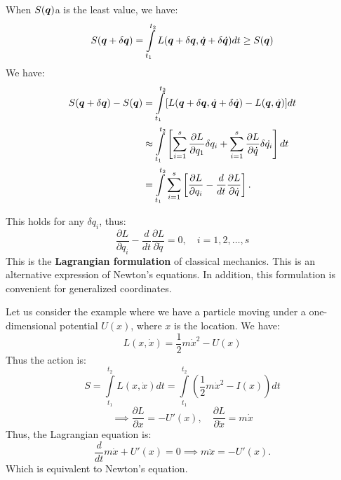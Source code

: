 \documentclass[../main/main.tex]{subfiles}
\begin{document}
When $S(\bm{q})$a is the least value, we have: \[
	S(\bm{q} + \delta \bm{q}) = \int\limits_{t_1}^{t_2}L(\bm{q}+\delta \bm{q}, \dot{\bm{q}}+ \delta \dot{\bm{q}}) dt \geq S(\bm{q})
\]
We have:
\begin{align*}
	S(\bm{q}+ \delta \bm{q}) -S(\bm{q}) & = \int\limits_{t_1}^{t_2} [L(\bm{q}+ \delta \bm{q} , \dot{\bm{q}} + \delta \dot{\bm{q}}) - L(\bm{q},\dot{\bm{q}})] dt                                                                                                     \\
	                        & \approx  \int\limits_{t_1}^{t_2} \left[ \sum\limits_{i=1}^{s} \frac{\partial L}{\partial q_1}  \delta q_i + \sum\limits_{i=1}^{s} \frac{\partial L}{\partial \dot{q}} \delta \dot{q_i} \right] dt \\
	                        & = \int\limits_{t_1}^{t_2} \sum\limits_{i=1}^{s} \left[ \frac{\partial L}{\partial q_i } - \frac{d}{dt} \frac{\partial L}{\partial \dot{q}} \right].
\end{align*}

This holds for any $\delta q_i$, thus: \[
	\frac{\partial L}{\partial q_i} - \frac{d}{dt} \frac{\partial L}{\partial \dot{q}} = 0, \quad i = 1,2, \ldots, s
\]
This is the \textbf{Lagrangian formulation} of classical mechanics.
This is an alternative expression of Newton's equations. In addition, this formulation is convenient for generalized coordinates.

\begin{example}
	Let us consider the example where we have a particle moving under a one-dimensional potential $U(x)$, where $x$ is the location. We have: \[
		L(x, \dot{x}) = \frac{1}{2} m \dot{x}^2 - U(x)
	\] Thus the action is: \[
		S = \int\limits_{t_1}^{t_2}L(x, \dot{x}) dt = \int\limits_{t_1}^{t_2} \left( \frac{1}{2} m \dot{x}^2 - I(x) \right) dt
	\]\[
		\implies \frac{\partial L}{\partial x} = -U'(x), \quad \frac{\partial L}{\partial \dot{x}} = m\dot{x}
	\]
	Thus, the Lagrangian equation is: \[
		\frac{d}{dt} m \dot{x} + U'(x) = 0 \implies m \ddot{x} = -U'(x).
	\]
	Which is equivalent to Newton's equation.
\end{example}
\end{document}
